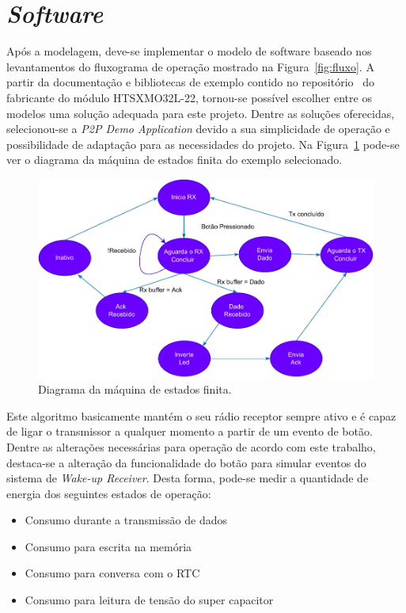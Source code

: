 \section{\textit{Software}}\label{sec:software}
Após a modelagem, deve-se implementar o modelo de software baseado nos levantamentos do fluxograma de operação mostrado na Figura~\ref{fig:fluxo}. A partir da documentação e bibliotecas de exemplo contido no repositório~\cite{HTSXMO32L} do fabricante do módulo HTSXMO32L-22, tornou-se possível escolher entre os modelos uma solução adequada para este projeto.
Dentre as soluções oferecidas, selecionou-se a \textit{P2P Demo Application} devido a sua simplicidade de operação e possibilidade de adaptação para as necessidades do projeto. Na Figura~\ref{fig:p2p} pode-se ver o diagrama da máquina de estados finita do exemplo selecionado.

\begin{figure}[h!]
  \caption{Diagrama da máquina de estados finita.}
  \begin{center}
      \includegraphics[scale=0.8]{img/p2p_fsm.drawio-1.pdf}
  \end{center}
  \label{fig:p2p}
\end{figure}

Este algoritmo basicamente mantém o seu rádio receptor sempre ativo e é capaz de ligar o transmissor a qualquer momento a partir de um evento de botão. Dentre as alterações necessárias para operação de acordo com este trabalho, destaca-se a alteração da funcionalidade do botão para simular eventos do sistema de \textit{Wake-up Receiver}. Desta forma, pode-se medir a quantidade de energia dos seguintes estados de operação:
\begin{itemize}
    \item Consumo durante a transmissão de dados
    \item Consumo para escrita na memória
    \item Consumo para conversa com o RTC
    \item Consumo para leitura de tensão do super capacitor
\end{itemize}


